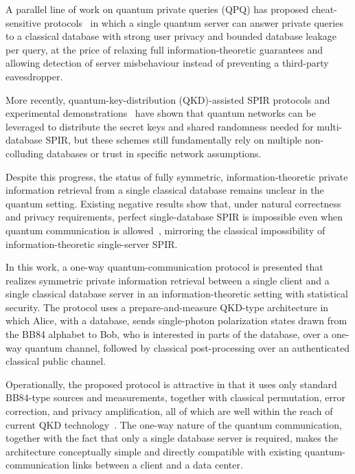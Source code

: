 \documentclass[%
 reprint,
superscriptaddress,
 amsmath,amssymb,
 aps,
]{revtex4-2}
\begin{document}
A parallel line of work on quantum private queries (QPQ) has proposed cheat-sensitive protocols~\cite{QPQ1, QPQ2, QPQ3} in which a single quantum server can answer private queries to a classical database with strong user privacy and bounded database leakage per query, at the price of relaxing full information-theoretic guarantees and allowing detection of server misbehaviour instead of preventing a third-party eavesdropper.

More recently, quantum-key-distribution (QKD)-assisted SPIR protocols and experimental demonstrations~\cite{QSPIR_multiple_database1, QSPIR_multiple_database2} have shown that quantum networks can be leveraged to distribute the secret keys and shared randomness needed for multi-database SPIR, but these schemes still fundamentally rely on multiple non-colluding databases or trust in specific network assumptions.

Despite this progress, the status of fully symmetric, information-theoretic private information retrieval from a single classical database remains unclear in the quantum setting. Existing negative results show that, under natural correctness and privacy requirements, perfect single-database SPIR is impossible even when quantum communication is allowed~\cite{Insecurity_Quantum_Oblivious_transfer1}, mirroring the classical impossibility of information-theoretic single-server SPIR.

In this work, a one-way quantum-communication protocol is presented that realizes symmetric private information retrieval between a single client and a single classical database server in an information-theoretic setting with statistical security.
The protocol uses a prepare-and-measure QKD-type architecture in which Alice, with a database, sends single-photon polarization states drawn from the BB84 alphabet to Bob, who is interested in parts of the database, over a one-way quantum channel, followed by classical post-processing over an authenticated classical public channel.

Operationally, the proposed protocol is attractive in that it uses only standard BB84-type sources and measurements, together with classical permutation, error correction, and privacy amplification, all of which are well within the reach of current QKD technology~\cite{Experimental_QKD1}. The one-way nature of the quantum communication, together with the fact that only a single database server is required, makes the architecture conceptually simple and directly compatible with existing quantum-communication links between a client and a data center.
\end{document}

